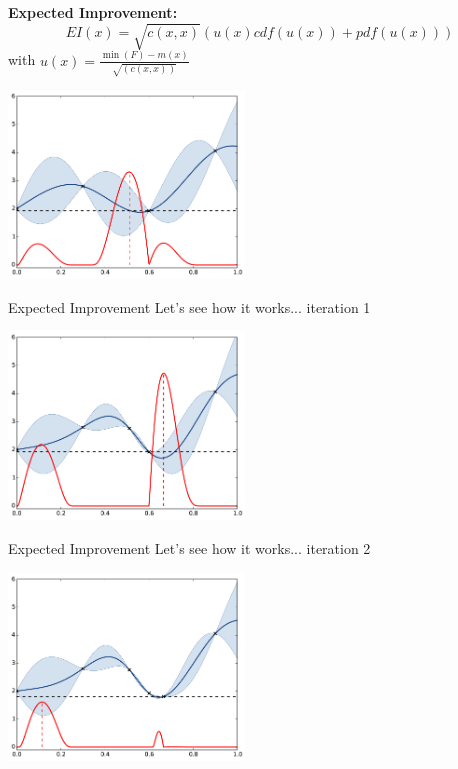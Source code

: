 \documentclass{beamer}
\begin{document}
\begin{frame}{}
\textbf{Expected Improvement:}
$$EI(x) = \sqrt{c(x,x)} (u(x) cdf(u(x)) + pdf(u(x)))$$
\qquad with $ \displaystyle u(x) = \frac{\min(F) - m(x)}{\sqrt{(c(x,x))}}$
\begin{center}
\includegraphics[height=5cm]{figures/python/ego_EI0}
\end{center}
\end{frame}

\begin{frame}{Expected Improvement}
Let's see how it works... iteration 1
\begin{center}
\includegraphics[height=5cm]{figures/python/ego_EI1}
\end{center}
\end{frame}

\begin{frame}[noframenumbering]{Expected Improvement}
Let's see how it works... iteration 2
\begin{center}
\includegraphics[height=5cm]{figures/python/ego_EI2}
\end{center}
\end{frame}
\end{document}
